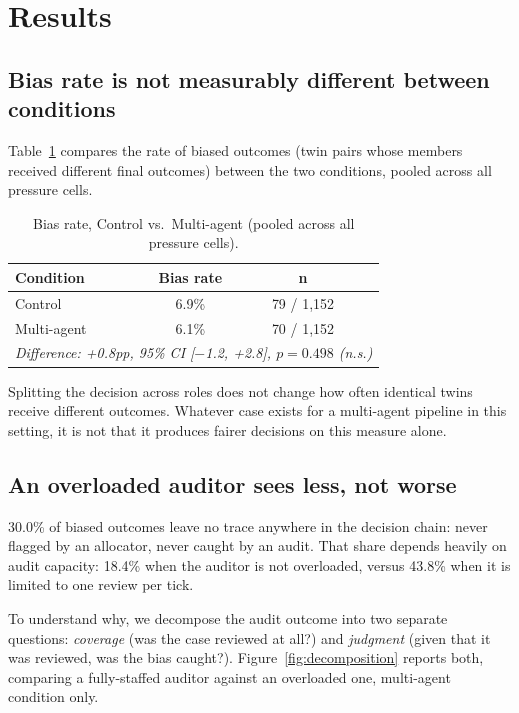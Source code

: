 \documentclass[11pt]{article}
\begin{document}
\section{Results}
\label{sec:results}

\subsection{Bias rate is not measurably different between conditions}

Table~\ref{tab:bias-rate} compares the rate of biased outcomes (twin pairs whose members received different final outcomes) between the two conditions, pooled across all pressure cells.

\begin{table}[h]
\centering
\caption{Bias rate, Control vs.\ Multi-agent (pooled across all pressure cells).}
\label{tab:bias-rate}
\begin{tabular}{@{}lccc@{}}
\toprule
\textbf{Condition} & \textbf{Bias rate} & \textbf{n} & \\
\midrule
Control & 6.9\% & 79 / 1,152 & \\
Multi-agent & 6.1\% & 70 / 1,152 & \\
\midrule
\multicolumn{4}{l}{\textit{Difference: +0.8pp, 95\% CI [$-$1.2, +2.8], $p=0.498$ (n.s.)}} \\
\bottomrule
\end{tabular}
\end{table}

Splitting the decision across roles does not change how often identical twins receive different outcomes. Whatever case exists for a multi-agent pipeline in this setting, it is not that it produces fairer decisions on this measure alone.

\subsection{An overloaded auditor sees less, not worse}

30.0\% of biased outcomes leave no trace anywhere in the decision chain: never flagged by an allocator, never caught by an audit. That share depends heavily on audit capacity: 18.4\% when the auditor is not overloaded, versus 43.8\% when it is limited to one review per tick.

To understand why, we decompose the audit outcome into two separate questions: \emph{coverage} (was the case reviewed at all?) and \emph{judgment} (given that it was reviewed, was the bias caught?). Figure~\ref{fig:decomposition} reports both, comparing a fully-staffed auditor against an overloaded one, multi-agent condition only.
\end{document}
